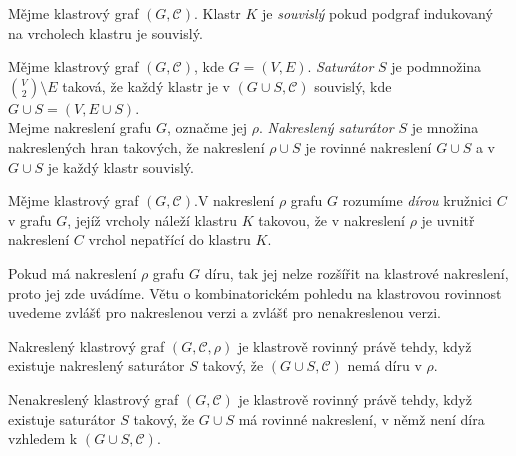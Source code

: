 \begin{defn}
Mějme klastrový graf $(G,\mathcal C)$. Klastr $K$ je \textit{souvislý} pokud podgraf indukovaný na vrcholech klastru je souvislý. 
\end{defn}

\begin{defn}
Mějme klastrový graf $(G,\mathcal C)$, kde $G=(V,E)$. \textit{Saturátor} $S$ je podmnožina ${V \choose 2} \setminus E$ taková, že každý klastr je v $(G \cup S,\mathcal C)$ souvislý, kde $G \cup S = (V,E \cup S)$. \\
Mejme nakreslení grafu $G$, označme jej $\rho$. \textit{Nakreslený saturátor} $S$ je množina nakreslených hran takových, že nakreslení $\rho \cup S$ je rovinné nakreslení $G \cup S$ a v $G \cup S$ je každý klastr souvislý. 
\end{defn}

\begin{defn}
Mějme klastrový graf $(G,\mathcal C)$.V nakreslení $\rho$ grafu $G$ rozumíme \textit{dírou} kružnici $C$ v grafu $G$, jejíž vrcholy náleží klastru $K$ takovou, že v nakreslení $\rho$  je uvnitř nakreslení $C$ vrchol nepatřící do klastru $K$.
\end{defn}

Pokud má nakreslení $\rho$ grafu $G$ díru, tak jej nelze rozšířit na klastrové nakreslení, proto jej zde uvádíme.
Větu o kombinatorickém pohledu na klastrovou rovinnost uvedeme zvlášť pro nakreslenou verzi a zvlášť pro nenakreslenou verzi.

\begin{theorem}
Nakreslený klastrový graf $(G,\mathcal C, \rho)$ je klastrově rovinný právě tehdy, když existuje nakreslený saturátor $S$ takový, že $(G \cup S,\mathcal C)$ nemá díru v $\rho$.
\end{theorem}

\begin{theorem}
Nenakreslený klastrový graf $(G,\mathcal C)$ je klastrově rovinný právě tehdy, když existuje saturátor $S$ takový, že $G \cup S$ má rovinné nakreslení, v němž není díra vzhledem k $(G \cup S,\mathcal C)$.
\end{theorem}